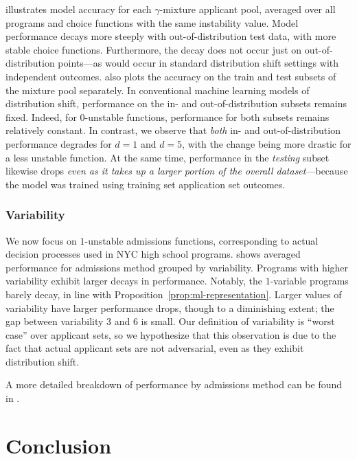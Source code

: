 \documentclass[letterpaper]{article}
\begin{document}
 illustrates model accuracy for each $\gamma$-mixture applicant pool, averaged over all programs and choice functions with the same instability value.
Model performance decays more steeply with out-of-distribution test data, with more stable choice functions. Furthermore, the decay does not occur just on out-of-distribution points---as would occur in standard distribution shift settings with independent outcomes.
 also plots the accuracy on the train and test subsets of the mixture pool separately.
In conventional machine learning models of distribution shift, performance on the in- and out-of-distribution subsets remains fixed.
Indeed, for $0$-unstable functions, performance for both subsets remains relatively constant.
In contrast, we observe that \textit{both} in- and out-of-distribution performance degrades for $d=1$ and $d=5$, with the change being more drastic for a less unstable function. At the same time, performance in the \textit{testing} subset likewise drops \textit{even as it takes up a larger portion of the overall dataset}---because the model was trained using training set application set outcomes.

\subsubsection{Variability}

We now focus on $1$-unstable admissions functions, corresponding to actual decision processes used in NYC high school programs.
 shows averaged performance for admissions method grouped by variability.
Programs with higher variability exhibit larger decays in performance.
Notably, the $1$-variable programs barely decay, in line with Proposition~\ref{prop:ml-representation}.
Larger values of variability have larger performance drops, though to a diminishing extent; the gap between variability $3$ and $6$ is small.
Our definition of variability is ``worst case'' over applicant sets, so we hypothesize that this observation is due to the fact that actual applicant sets are not adversarial, even as they exhibit distribution shift.

A more detailed breakdown of performance by admissions method can be found in .

\section{Conclusion} \label{sec:discussion}
\end{document}
